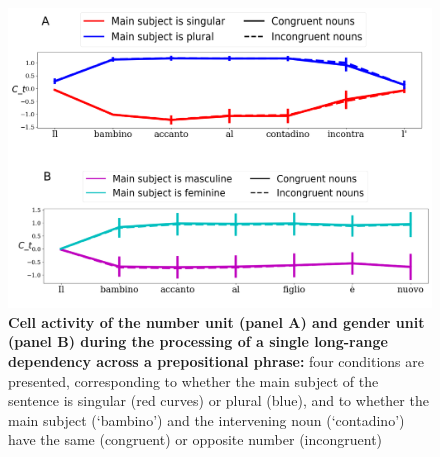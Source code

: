\begin{figure}
    \centering
    \includegraphics[width=\textwidth]{figures/model_activations_nounpp.png}
    \caption{\textbf{Cell activity of the number unit (panel A) and gender unit (panel B) during the processing of a single long-range dependency across a prepositional phrase:} four conditions are presented, corresponding to whether the main subject of the sentence is singular (red curves) or plural (blue), and to whether the main subject (`bambino') and the intervening noun (`contadino') have the same (congruent) or opposite number (incongruent)}
    \label{fig:nounpp}
\end{figure} 
